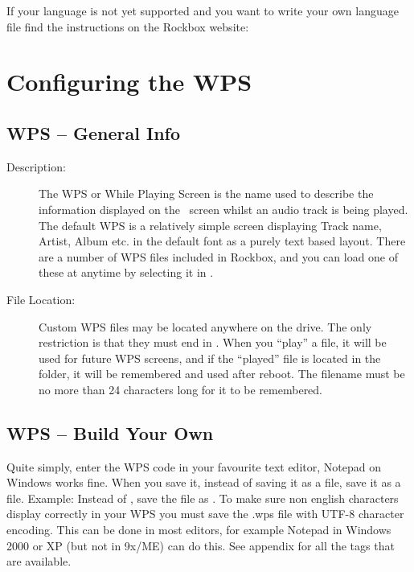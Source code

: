 If your language is not yet supported and you want to write your own language
file find the instructions on the Rockbox website:

\section{\label{ref:ConfiguringtheWPS}Configuring the WPS}

\subsection{WPS -- General Info}

\begin{description}
\item[Description: ] The WPS or While Playing Screen is the name used to describe 
the information displayed on the \daps\ screen whilst an audio track is
being played. The default WPS is a relatively simple screen displaying
Track name, Artist, Album etc. in the default font as a purely text based
layout. There are a number of WPS files included in Rockbox, and you can 
load one of these at anytime by selecting it in
.



\item [File Location: ]Custom WPS files may be located anywhere on the drive. 
The only restriction is that they must end in . When you ``play''
a  file, it will be used for future WPS screens, and if the 
``played''  file is located in the  folder, it 
will be remembered and used after reboot. The  filename must be no 
more than 24 characters long for it to be remembered.
\end{description}

\subsection{\label{ref:CreateYourOwnWPS}WPS -- Build Your Own}
Quite simply, enter the WPS code in your favourite text editor, Notepad on
Windows works fine. When you save it, instead of saving it as a  
file, save it as a  file. Example: Instead of , 
save the file as . To make sure non english characters 
display correctly in your WPS you must save the .wps file with UTF-8 character 
encoding. This can be done in most editors, for example Notepad in Windows 2000
or XP (but not in 9x/ME) can do this. See appendix  for all
the tags that are available.

